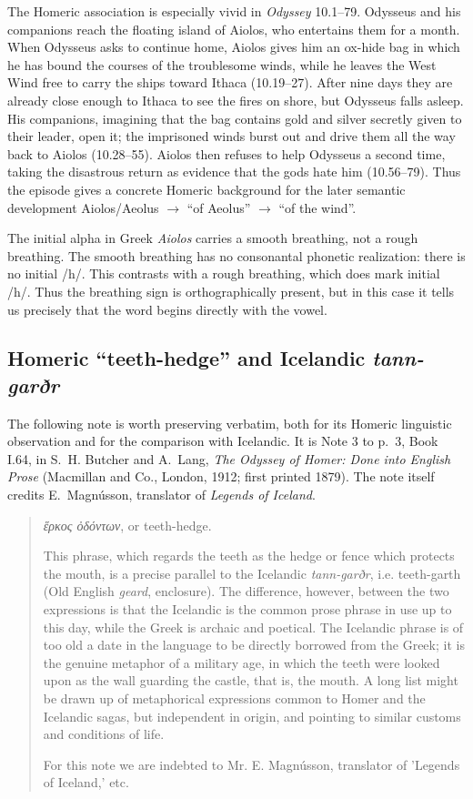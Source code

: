The Homeric association is especially vivid in \emph{Odyssey} 10.1--79. Odysseus and his companions reach the floating island of Aiolos, who entertains them for a month. When Odysseus asks to continue home, Aiolos gives him an ox-hide bag in which he has bound the courses of the troublesome winds, while he leaves the West Wind free to carry the ships toward Ithaca (10.19--27). After nine days they are already close enough to Ithaca to see the fires on shore, but Odysseus falls asleep. His companions, imagining that the bag contains gold and silver secretly given to their leader, open it; the imprisoned winds burst out and drive them all the way back to Aiolos (10.28--55). Aiolos then refuses to help Odysseus a second time, taking the disastrous return as evidence that the gods hate him (10.56--79). Thus the episode gives a concrete Homeric background for the later semantic development Aiolos/Aeolus $\to$ ``of Aeolus'' $\to$ ``of the wind''. 

The initial alpha in Greek \emph{Aiolos} carries a smooth breathing, not a
rough breathing. The smooth breathing has no consonantal phonetic
realization: there is no initial /h/. This contrasts with a rough breathing,
which does mark initial /h/. Thus the breathing sign is orthographically
present, but in this case it tells us precisely that the word begins directly
with the vowel.

\subsection{Homeric ``teeth-hedge'' and Icelandic \emph{tann-garðr}}
\label{subsection-homeric-teeth-hedge}

The following note is worth preserving verbatim, both for its Homeric
linguistic observation and for the comparison with Icelandic. It is Note 3
to p.~3, Book I.64, in S.~H. Butcher and A.~Lang, \emph{The Odyssey of Homer:
Done into English Prose} (Macmillan and Co., London, 1912; first printed
1879). The note itself credits E.~Magnússon, translator of \emph{Legends of Iceland}.

\begin{quote}
\emph{ἕρκος ὀδόντων}, or teeth-hedge.

This phrase, which regards the teeth as the hedge or fence which protects the
mouth, is a precise parallel to the Icelandic \emph{tann-garðr}, i.e.
teeth-garth (Old English \emph{geard}, enclosure). The difference, however,
between the two expressions is that the Icelandic is the common prose phrase
in use up to this day, while the Greek is archaic and poetical. The Icelandic
phrase is of too old a date in the language to be directly borrowed from the
Greek; it is the genuine metaphor of a military age, in which the teeth were
looked upon as the wall guarding the castle, that is, the mouth. A long list
might be drawn up of metaphorical expressions common to Homer and the
Icelandic sagas, but independent in origin, and pointing to similar customs
and conditions of life.

For this note we are indebted to Mr. E. Magnússon, translator of 'Legends of
Iceland,' etc.
\end{quote}

